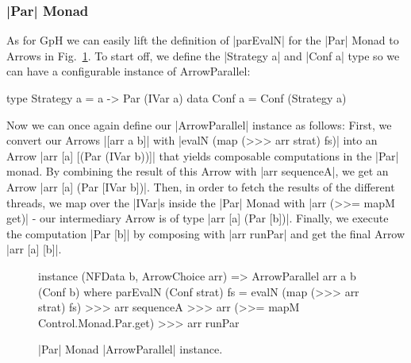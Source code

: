 \subsubsection{|Par| Monad}
As for GpH we can easily lift the definition of |parEvalN| for the |Par| Monad to Arrows in Fig.~\ref{fig:ArrowParallelParMonad}. To start off, we define the |Strategy a| and |Conf a| type so we can have a configurable instance of ArrowParallel:
\begin{code}
type Strategy a = a -> Par (IVar a)
data Conf a = Conf (Strategy a)
\end{code}
Now we can once again define our |ArrowParallel| instance as follows: First, we convert our Arrows |[arr a b]| with |evalN (map (>>> arr strat) fs)| into an Arrow |arr [a] [(Par (IVar b))]| that yields composable computations in the |Par| monad. By combining the result of this Arrow with |arr sequenceA|, we get an Arrow |arr [a] (Par [IVar b])|. Then, in order to fetch the results of the different threads, we map over the |IVar|s inside the |Par| Monad with |arr (>>= mapM get)| - our intermediary Arrow is of type |arr [a] (Par [b])|. Finally, we execute the computation |Par [b]| by composing with |arr runPar| and get the final Arrow |arr [a] [b]|.
\begin{figure}[h]
\begin{code}
instance (NFData b, ArrowChoice arr) => ArrowParallel arr a b (Conf b) where
    parEvalN (Conf strat) fs = evalN (map (>>> arr strat) fs) >>>
                    arr sequenceA >>>
                    arr (>>= mapM Control.Monad.Par.get) >>>
                    arr runPar
\end{code} %
\caption{|Par| Monad |ArrowParallel| instance.}
\label{fig:ArrowParallelParMonad}
\end{figure}

